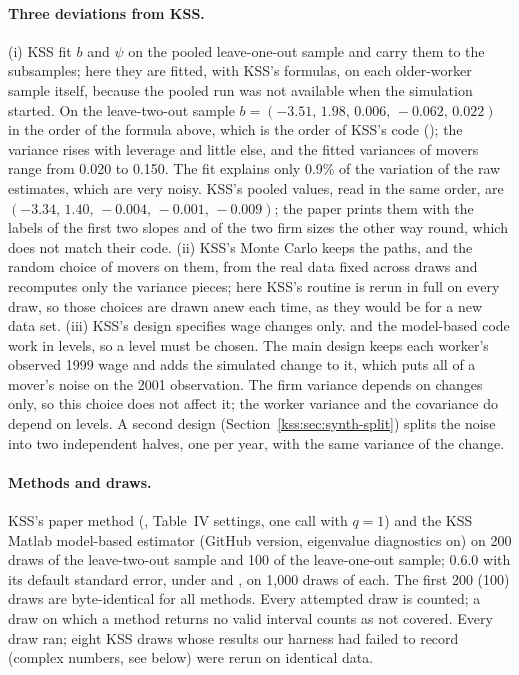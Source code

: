 \paragraph{Three deviations from KSS.} (i) KSS fit $b$ and $\psi$ on the pooled leave-one-out sample and carry
them to the subsamples; here they are fitted, with KSS's formulas, on each older-worker sample itself, because
the pooled run was not available when the simulation started. On the leave-two-out sample
$b=(-3.51,\,1.98,\,0.006,\,-0.062,\,0.022)$ in the order of the formula above, which is the order of KSS's code
(); the variance rises with leverage and little else, and the fitted variances of movers
range from 0.020 to 0.150. The fit explains only 0.9\% of the variation of the raw estimates, which are very
noisy. KSS's pooled values, read in the same order, are $(-3.34,\,1.40,\,-0.004,\,-0.001,\,-0.009)$; the paper
prints them with the labels of the first two slopes and of the two firm sizes the other way round, which does not
match their code. (ii) KSS's Monte Carlo keeps the paths, and the random choice of movers on them, from the real
data fixed across draws and recomputes only the variance pieces; here KSS's routine is rerun in full on every
draw, so those choices are drawn anew each time, as they would be for a new data set. (iii) KSS's design
specifies wage changes only. \fevc{} and the
model-based code work in levels, so a level must be chosen. The main design keeps each worker's observed 1999
wage and adds the simulated change to it, which puts all of a mover's noise on the 2001 observation. The firm
variance depends on changes only, so this choice does not affect it; the worker variance and the covariance do
depend on levels. A second design (Section~\ref{kss:sec:synth-split}) splits the noise into two independent halves,
one per year, with the same variance of the change.

\paragraph{Methods and draws.} KSS's paper method (, Table~IV settings, one call with
$q=1$) and the KSS Matlab model-based estimator (GitHub version, eigenvalue diagnostics on) on 200 draws of the
leave-two-out sample and 100 of the leave-one-out sample; \fevc{} 0.6.0 with its default standard error, under
 and , on 1{,}000 draws of each. The first 200 (100) draws are
byte-identical for all methods. Every attempted draw is counted; a draw on which a method returns no valid
interval counts as not covered. Every draw ran; eight KSS draws whose results our harness had failed to record
(complex numbers, see below) were rerun on identical data.

